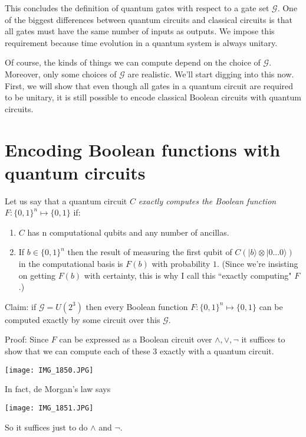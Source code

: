 \documentclass{article}
\begin{document}
This concludes the definition of quantum gates with respect to a gate set $\mathscr{G}$.  One of the biggest differences between quantum circuits and classical circuits is that all gates must have the same number of inputs as outputs. We impose this requirement because time evolution in a quantum system is always unitary.  

Of course, the kinds of things we can compute depend on the choice of $\mathscr{G}$.  Moreover, only some choices of $\mathscr{G}$ are realistic.  We'll start digging into this now.  First, we will show that even though all gates in a quantum circuit are required to be unitary, it is still possible to encode classical Boolean circuits with quantum circuits.

\section{Encoding Boolean functions with quantum circuits}
Let us say that a quantum circuit $C$ \emph{exactly computes the Boolean function} $F:\{0,1\}^{n} \mapsto \{0,1\} $ if:

\begin{enumerate}
    \item $C$ has n computational qubits and any number of ancillas.
    \item If $b \in \{0,1\}^{n} $ then the result of measuring the first qubit of $C(|b\rangle \otimes |0...0\rangle)$ in the computational basis is $ F(b)$ with probability $1$.  (Since we're insisting on getting $F(b)$ with certainty, this is why I call this ``exactly computing" $F$.)
\end{enumerate}
 
\begin{framed}
Claim: if $\mathscr{G}=U(2^{3})$ then every Boolean function $F:\{0,1\}^{n} \mapsto \{0,1\} $ can be computed exactly by some circuit over this $\mathscr{G}$.
\end{framed}

Proof: Since $F$ can be expressed as a Boolean circuit over $ \wedge, \vee, \neg$ it suffices to show that we can compute each of these 3 exactly with a quantum circuit.
\begin{center}
\texttt{[image: IMG\_1850.JPG]}
\end{center}
In fact, de Morgan's law says
\begin{center}
\texttt{[image: IMG\_1851.JPG]}
\end{center}
So it suffices just to do $\wedge$ and  $\neg$.
\end{document}
